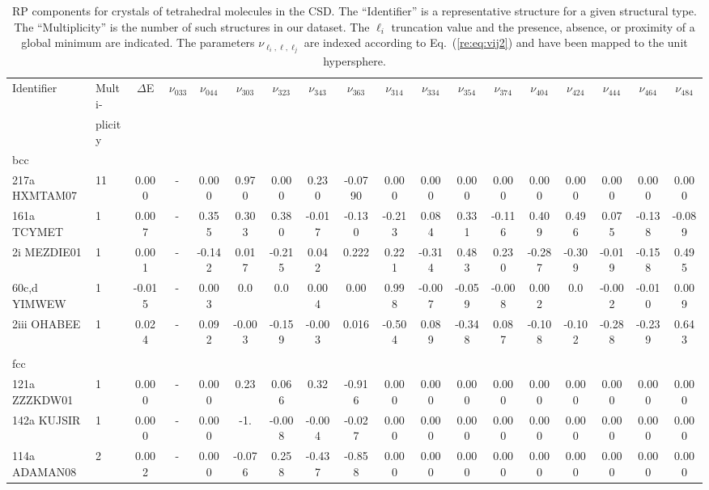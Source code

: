 \begin{table}[!ht]
\caption{RP components for crystals of tetrahedral molecules in the
CSD.  The ``Identifier'' is a representative structure for a given structural type.  The ``Multiplicity'' is the number of such structures in our dataset. The $\ell_i$ truncation value and the presence, absence, or
proximity of a global minimum are indicated. The parameters
$\nu_{\ell_i,\ell,\ell_j}$ are indexed according to
Eq.~(\ref{re:eq:vij2}) and have been mapped to the unit hypersphere.}
\label{RPTop} \tiny
\begin{tabular}{llcccccccccccccccc}\hline
Identifier & Multi-& $\Delta$E & $\nu_{033}$ & $\nu_{044}$ & $\nu_{303}$ &
$\nu_{323}$ & $\nu_{343}$ & $\nu_{363}$ & $\nu_{314}$ & $\nu_{334}$
& $\nu_{354}$ & $\nu_{374}$ & $\nu_{404}$ & $\nu_{424}$ &
$\nu_{444}$ & $\nu_{464}$ & $\nu_{484}$ \\
& plicity & & & & & & & & & & & & & & & & \\
\hline
bcc\\
217a HXMTAM07 & 11 & 0.000 & - & 0.000 & 0.970 & 0.000 & 0.230 & -0.0790 & 0.000 & 0.000 & 0.000 & 0.000 & 0.000 & 0.000 & 0.000 & 0.000 & 0.000 \\
161a TCYMET & 1 & 0.007 & - & 0.355 & 0.303 & 0.380 & -0.017 & -0.130 & -0.213 & 0.084 & 0.331 & -0.116 & 0.409 & 0.496 & 0.075 & -0.138 & -0.089 \\
2i MEZDIE01 & 1 & 0.001 & - & -0.142 & 0.017 & -0.215 & 0.042 & 0.222 & 0.221 & -0.314 & 0.483 & 0.230 & -0.287 & -0.309 & -0.019 & -0.158 & 0.495 \\
60c,d YIMWEW & 1 & -0.015 & - & 0.003 & 0.0 & 0.0 & 0.004 & 0.00 & 0.998 & -0.007 & -0.059 & -0.008 & 0.002 & 0.0 & -0.002 & -0.010 & 0.009 \\
2iii OHABEE & 1 & 0.024 & - & 0.092 & -0.003 & -0.159 & -0.003 & 0.016 & -0.504 & 0.089 & -0.348 & 0.087 & -0.108 & -0.102 & -0.288 & -0.239 & 0.643 \\
\\
fcc\\
121a ZZZKDW01 & 1 & 0.000 & - & 0.000 & 0.23 & 0.066 & 0.32 & -0.916 & 0.000 & 0.000 & 0.000 & 0.000 & 0.000 & 0.000 & 0.000 & 0.000 & 0.000 \\
142a KUJSIR & 1 & 0.000 & - & 0.000 & -1. & -0.008 & -0.004 & -0.027 & 0.000 & 0.000 & 0.000 & 0.000 & 0.000 & 0.000 & 0.000 & 0.000 & 0.000 \\
114a ADAMAN08 & 2 & 0.002 & - & 0.000 & -0.076 & 0.258 & -0.437 & -0.858 & 0.000 & 0.000 & 0.000 & 0.000 & 0.000 & 0.000 & 0.000 & 0.000 & 0.000 \\

\end{tabular}
\end{table}
